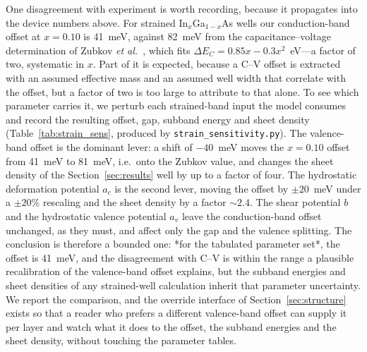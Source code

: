 \documentclass[preprint,12pt]{elsarticle}
\begin{document}
One disagreement with experiment is worth recording, because it propagates
into the device numbers above. For strained In$_x$Ga$_{1-x}$As wells our
conduction-band offset at $x=0.10$ is \SI{41}{meV}, against \SI{82}{meV} from
the capacitance--voltage determination of Zubkov \emph{et
al.}~\cite{Zubkov2004}, which fits $\Delta E_C=0.85x-0.3x^2$~eV---a factor of
two, systematic in $x$. Part of it is expected, because a C--V offset is
extracted with an assumed effective mass and an assumed well width that
correlate with the offset, but a factor of two is too large to attribute to
that alone. To see which parameter carries it, we perturb each strained-band
input the model consumes and record the resulting offset, gap, subband energy
and sheet density (Table~\ref{tab:strain_sens}, produced by
\texttt{strain\_sensitivity.py}). The valence-band offset is the dominant
lever: a shift of $-40$~meV moves the $x=0.10$ offset from \SI{41}{meV} to
\SI{81}{meV}, i.e.\ onto the Zubkov value, and changes the sheet density of
the Section~\ref{sec:results} well by up to a factor of four. The hydrostatic
deformation potential $a_c$ is the second lever, moving the offset by
$\pm20$~meV under a $\pm20\%$ rescaling and the sheet density by a factor
$\sim2.4$. The shear potential $b$ and the hydrostatic valence potential
$a_v$ leave the conduction-band offset unchanged, as they must, and affect
only the gap and the valence splitting. The conclusion is therefore a
bounded one: *for the tabulated parameter set*, the offset is \SI{41}{meV},
and the disagreement with C--V is within the range a plausible recalibration
of the valence-band offset explains, but the subband energies and sheet
densities of any strained-well calculation inherit that parameter
uncertainty. We report the comparison, and the override interface of
Section~\ref{sec:structure} exists so that a reader who prefers a different
valence-band offset can supply it per layer and watch what it does to the
offset, the subband energies and the sheet density, without touching the
parameter tables.
\end{document}
